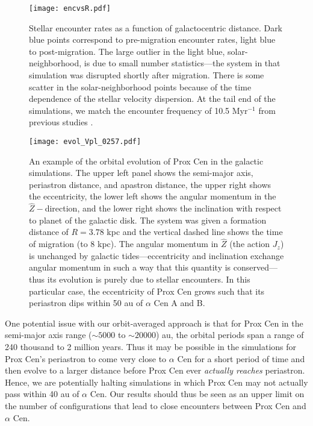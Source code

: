 \documentclass[preprint,12pt]{aastex}
\begin{document}
\begin{figure}
\centering
\texttt{[image: encvsR.pdf]}
\caption{Stellar encounter rates as a function of galactocentric distance.
  Dark blue points correspond to pre-migration encounter rates, light 
  blue to post-migration. The large outlier in the light blue, 
  solar-neighborhood, is due to small number statistics---the system 
  in that simulation was disrupted shortly after migration. There is some 
  scatter in the solar-neighborhood points because of the time dependence 
  of the stellar velocity dispersion. At the tail end of the simulations, we 
  match the encounter frequency of 10.5 Myr$^{-1}$ from previous 
  studies \citep{Garciasanchez2001,Rickman2008}.}
\label{fig:encrates}
\end{figure}


\begin{figure}
\texttt{[image: evol\_Vpl\_0257.pdf]}
\caption{An example of the orbital evolution of Prox Cen in the galactic 
  simulations. The upper left panel shows the semi-major axis, periastron 
  distance, and apastron distance, the upper right shows the eccentricity, 
  the lower left shows the angular momentum in the $\hat{Z}-$direction, 
  and the lower right shows the inclination with respect to planet of the 
  galactic disk. The system was given a formation distance of $R = 3.78$ 
  kpc and the vertical dashed line shows the time of migration (to 8 kpc). 
  The angular momentum in $\hat{Z}$ (the action $J_z$) is unchanged by 
  galactic tides---eccentricity and inclination exchange angular momentum 
  in such a way that this quantity is conserved---thus its evolution is purely 
  due to stellar encounters. In this particular case, the eccentricity of Prox Cen 
  grows such that its periastron dips within 50 au of $\alpha$ Cen A and B.}
\label{fig:galevolution}
\end{figure}

One potential issue with our orbit-averaged approach is that for Prox Cen in the 
semi-major axis range ($\sim5000$ to $\sim20000$) au, the orbital periods 
span a range of 240 thousand to 2 million years. Thus it may be possible in 
the simulations for Prox Cen's periastron to come very close to $\alpha$ Cen 
for a short period of time and then evolve to a larger distance before Prox Cen 
ever \emph{actually reaches} periastron. Hence, we are potentially halting 
simulations in which 
Prox Cen may not actually pass within 40 au of $\alpha$ Cen. Our results 
should thus be seen as an upper limit on the number of configurations 
that lead to close encounters between Prox Cen and $\alpha$ Cen.
 
\end{document}
